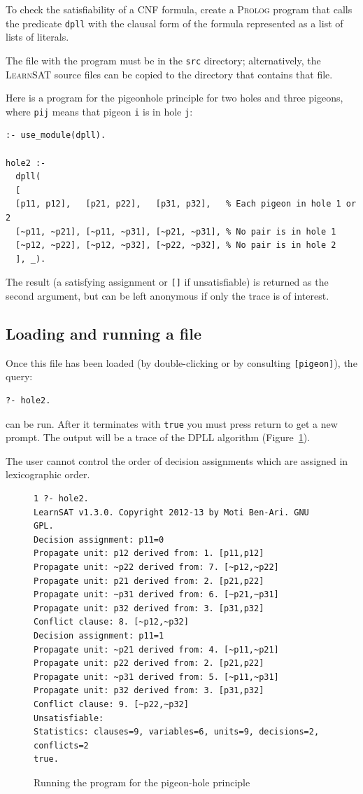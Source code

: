 \documentclass[11pt]{report}
\newcommand*{\p}[1]{\textup{\texttt{#1}}}
\newcommand*{\ls}{\textsc{LearnSAT}}
\newcommand*{\pl}{\textsc{Prolog}}
\begin{document}
To check the satisfiability of a CNF formula, create a \pl{} program
that calls the predicate \p{dpll} with the clausal form of the formula
represented as a list of lists of literals.

The file with the program must be in the \p{src} directory;
alternatively, the \ls{} source files can be copied to the directory
that contains that file.

Here is a program for the pigeonhole principle for two holes and three
pigeons, where \p{pij} means that pigeon \p{i} is in hole \p{j}:

\begin{verbatim}
:- use_module(dpll).

hole2 :-
  dpll(
  [
  [p11, p12],   [p21, p22],   [p31, p32],   % Each pigeon in hole 1 or 2 
  [~p11, ~p21], [~p11, ~p31], [~p21, ~p31], % No pair is in hole 1
  [~p12, ~p22], [~p12, ~p32], [~p22, ~p32], % No pair is in hole 2
  ], _).
\end{verbatim}

The result (a satisfying assignment or \p{[]} if unsatisfiable) is
returned as the second argument, but can be left anonymous if only
the trace is of interest.

\subsection{Loading and running a file}

Once this file has been loaded (by double-clicking or by consulting
\p{[pigeon]}), the query:
\begin{verbatim}
?- hole2. 
\end{verbatim}

can be run. After it terminates with \p{true} you must press
return to get a new prompt. The output will be a trace of the DPLL
algorithm (Figure~\ref{fig.pigeon}).

The user cannot control the order of decision assignments which are
assigned in lexicographic order.

\begin{figure}[tbp]
\begin{verbatim}
1 ?- hole2.
LearnSAT v1.3.0. Copyright 2012-13 by Moti Ben-Ari. GNU GPL.
Decision assignment: p11=0
Propagate unit: p12 derived from: 1. [p11,p12]
Propagate unit: ~p22 derived from: 7. [~p12,~p22]
Propagate unit: p21 derived from: 2. [p21,p22]
Propagate unit: ~p31 derived from: 6. [~p21,~p31]
Propagate unit: p32 derived from: 3. [p31,p32]
Conflict clause: 8. [~p12,~p32]
Decision assignment: p11=1
Propagate unit: ~p21 derived from: 4. [~p11,~p21]
Propagate unit: p22 derived from: 2. [p21,p22]
Propagate unit: ~p31 derived from: 5. [~p11,~p31]
Propagate unit: p32 derived from: 3. [p31,p32]
Conflict clause: 9. [~p22,~p32]
Unsatisfiable:
Statistics: clauses=9, variables=6, units=9, decisions=2, conflicts=2
true.
\end{verbatim}
\caption{Running the program for the pigeon-hole principle}\label{fig.pigeon}
\end{figure}
\end{document}

